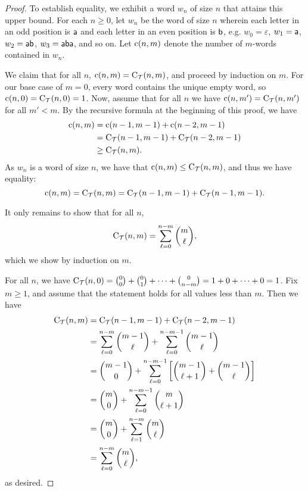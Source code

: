 \begin{proof}
To establish equality, we exhibit a word $w_n$ of size $n$ that attains this upper bound. For each $n \ge 0$, let $w_n$ be the word of size $n$ wherein each letter in an odd position is $\textsf{a}$ and each letter in an even position is $\textsf{b}$, e.g. $w_0 = \varepsilon$, $w_1 = \textsf{a}$, $w_2 = \textsf{a} \textsf{b}$, $w_3 = \textsf{a} \textsf{b} \textsf{a}$, and so on. Let $\operatorname{c}(n, m)$ denote the number of $m$-words contained in $w_n$.

We claim that for all $n$, $\operatorname{c}(n, m) = \operatorname{C}_{\mathcal{T}}(n, m)$, and proceed by induction on $m$. For our base case of $m = 0$, every word contains the unique empty word, so $\operatorname{c}(n, 0) = \operatorname{C}_{\mathcal{T}}(n, 0) = 1$. Now, assume that for all $n$ we have $\operatorname{c}(n, m') = \operatorname{C}_{\mathcal{T}}(n, m')$ for all $m' < m$. By the recursive formula at the beginning of this proof, we have
\begin{align*}
    \operatorname{c}(n, m)
        &= \operatorname{c}(n-1, m-1) + \operatorname{c}(n-2, m-1) \\
        &= \operatorname{C}_{\mathcal{T}}(n-1, m-1) + \operatorname{C}_{\mathcal{T}}(n-2, m-1) \\
        &\ge \operatorname{C}_{\mathcal{T}}(n,m).
\end{align*}
As $w_n$ is a word of size $n$, we have that $\operatorname{c}(n,m) \le \operatorname{C}_{\mathcal{T}}(n,m)$, and thus we have equality:
\[
    \operatorname{c}(n, m)
    =
    \operatorname{C}_{\mathcal{T}}(n,m)
    =
    \operatorname{C}_{\mathcal{T}}(n-1,m-1) + \operatorname{C}_{\mathcal{T}}(n-1,m-1).
\]

It only remains to show that for all $n$,
\[
    \operatorname{C}_{\mathcal{T}}(n,m)
    = 
    \sum_{\ell = 0}^{n-m} \binom{m}{\ell},
\]
which we show by induction on $m$.

For all $n$, we have $\operatorname{C}_{\mathcal{T}}(n,0) = \binom{0}{0} + \binom{0}{1} + \cdots + \binom{0}{n-m} = 1 + 0 + \cdots + 0 = 1$. Fix $m \ge 1$, and assume that the statement holds for all values less than $m$. Then we have
\begin{align*}
    \operatorname{C}_{\mathcal{T}}(n,m) 
        &= \operatorname{C}_{\mathcal{T}}(n-1,m-1) + \operatorname{C}_{\mathcal{T}}(n-2,m-1) \\
        &= \sum_{\ell = 0}^{n-m} \binom{m-1}{\ell} + \sum_{\ell = 0}^{n-m-1} \binom{m-1}{\ell} \\
        &= \binom{m-1}{0} + \sum_{\ell = 0}^{n-m-1} \left[ \binom{m-1}{\ell+1} + \binom{m-1}{\ell} \right] \\
        &= \binom{m}{0} + \sum_{\ell = 0}^{n-m-1} \binom{m}{\ell+1} \\
        &= \binom{m}{0} + \sum_{\ell = 1}^{n-m} \binom{m}{\ell} \\
        &= \sum_{\ell = 0}^{n-m} \binom{m}{\ell},
\end{align*}
as desired.
\end{proof}

